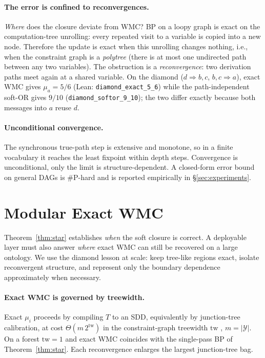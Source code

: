 \documentclass[letterpaper]{article}
\newcommand{\tw}{\ensuremath{\mathrm{tw}}}
\begin{document}
\paragraph{The error is confined to reconvergences.}
\emph{Where} does the closure deviate from WMC? BP on a loopy graph is exact on the computation-tree unrolling: every repeated visit to a variable is copied into a new node. Therefore the update is exact when this unrolling changes nothing, i.e., when the constraint graph is a \emph{polytree} (there is at most one undirected path between any two variables). The obstruction is a \emph{reconvergence}: two derivation paths meet again at a shared variable. On the diamond ($d\!\Rightarrow\!b,c$, $b,c\!\Rightarrow\!a$), exact WMC gives $\mu_a=5/6$ (Lean: \texttt{diamond\_exact\_5\_6}) while the path-independent soft-OR gives $9/10$ (\texttt{diamond\_softor\_9\_10}); the two differ exactly because both messages into $a$ reuse $d$.

\paragraph{Unconditional convergence.}
The synchronous true-path step is extensive and monotone, so in a finite vocabulary it reaches the least fixpoint within $\mathrm{depth}$ steps. Convergence is unconditional, only the limit is structure-dependent. A closed-form error bound on general DAGs is \#P-hard and is reported empirically in \S\ref{sec:experiments}.

\section{Modular Exact WMC}\label{sec:scaling}
Theorem~\ref{thm:star} establishes \emph{when} the soft closure is correct. A deployable layer must also answer \emph{where} exact WMC can still be recovered on a large ontology. We use the diamond lesson at scale: keep tree-like regions exact, isolate reconvergent structure, and represent only the boundary dependence approximately when necessary.

\paragraph{Exact WMC is governed by treewidth.}
Exact $\mu_i$ proceeds by compiling $T$ to an SDD, equivalently by junction-tree calibration, at cost $\Theta(m\,2^{\tw})$ in the constraint-graph treewidth $\tw$ \citep{darwiche2011sdd,darwiche2002kcmap,bodlaender1993treewidth}, $m=|\mathcal Y|$. On a forest $\tw=1$ and exact WMC coincides with the single-pass BP of Theorem~\ref{thm:star}. Each reconvergence enlarges the largest junction-tree bag.
\end{document}
